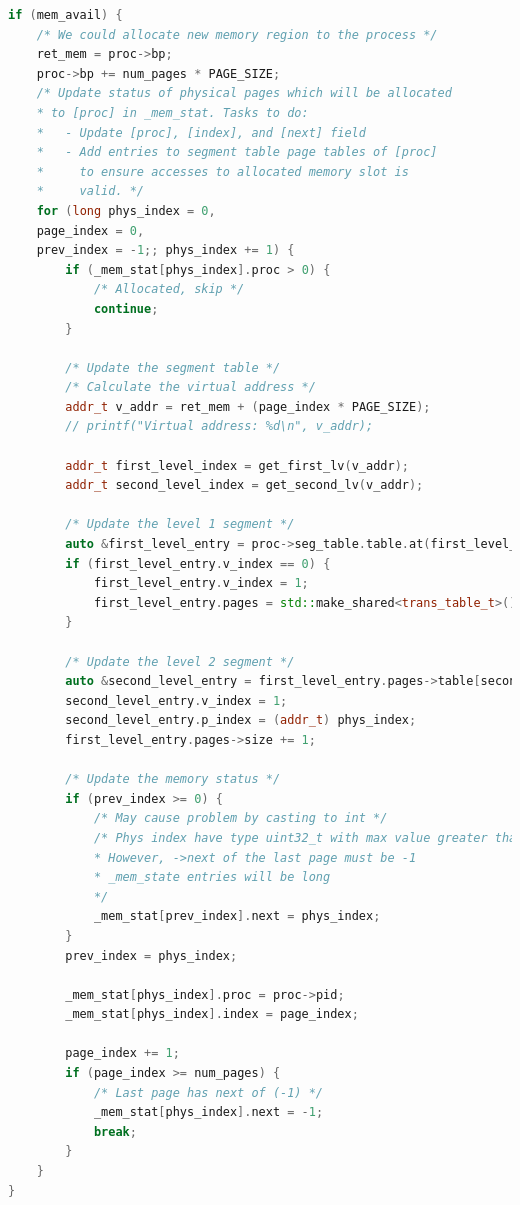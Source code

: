 \documentclass[]{article}
\begin{document}
\begin{lstlisting}[language=C++]
if (mem_avail) {
	/* We could allocate new memory region to the process */
	ret_mem = proc->bp;
	proc->bp += num_pages * PAGE_SIZE;
	/* Update status of physical pages which will be allocated
	* to [proc] in _mem_stat. Tasks to do:
	* 	- Update [proc], [index], and [next] field
	* 	- Add entries to segment table page tables of [proc]
	* 	  to ensure accesses to allocated memory slot is
	* 	  valid. */
	for (long phys_index = 0,
	page_index = 0,
	prev_index = -1;; phys_index += 1) {
		if (_mem_stat[phys_index].proc > 0) {
			/* Allocated, skip */
			continue;
		}
		
		/* Update the segment table */
		/* Calculate the virtual address */
		addr_t v_addr = ret_mem + (page_index * PAGE_SIZE);
		// printf("Virtual address: %d\n", v_addr);
		
		addr_t first_level_index = get_first_lv(v_addr);
		addr_t second_level_index = get_second_lv(v_addr);
		
		/* Update the level 1 segment */
		auto &first_level_entry = proc->seg_table.table.at(first_level_index);
		if (first_level_entry.v_index == 0) {
			first_level_entry.v_index = 1;
			first_level_entry.pages = std::make_shared<trans_table_t>();
		}
		
		/* Update the level 2 segment */
		auto &second_level_entry = first_level_entry.pages->table[second_level_index];
		second_level_entry.v_index = 1;
		second_level_entry.p_index = (addr_t) phys_index;
		first_level_entry.pages->size += 1;
		
		/* Update the memory status */
		if (prev_index >= 0) {
			/* May cause problem by casting to int */
			/* Phys index have type uint32_t with max value greater than int in _mem_stat
			* However, ->next of the last page must be -1
			* _mem_state entries will be long
			*/
			_mem_stat[prev_index].next = phys_index;
		}
		prev_index = phys_index;
		
		_mem_stat[phys_index].proc = proc->pid;
		_mem_stat[phys_index].index = page_index;
		
		page_index += 1;
		if (page_index >= num_pages) {
			/* Last page has next of (-1) */
			_mem_stat[phys_index].next = -1;
			break;
		}
	}
}
\end{lstlisting}
\end{document}
